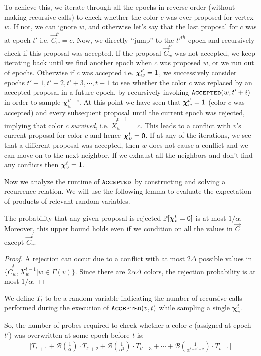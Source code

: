 To achieve this, we iterate through all the epochs in reverse order (without making recursive calls)
to check whether the color $c$ was ever proposed for vertex $w$.
If not, we can ignore $w$, and otherwise let's say that the last proposal for $c$ was at epoch $t'$ i.e. $\vec C^{t'}_w = c$.
Now, we directly ``jump'' to the $t'^{th}$ epoch and recursively check if this proposal was accepted.
If the proposal $\vec C^{t'}_w$ was not accepted, we keep iterating back until we find another epoch when $c$ was proposed $w$, or we run out of epochs.
Otherwise if $c$ was accepted i.e. $\bm\chi^{t'}_w = \mathsf{1}$,
we successively consider epochs $t'+1, t'+2, t'+3, \cdots, t-1$ to see whether the color $c$ was replaced by an accepted proposal in a future epoch,
by recursively invoking $\texttt{\textsc{Accepted}}(w,t'+i)$ in order to sample $\bm\chi^{t'+i}_w$.
At this point we have seen that $\bm\chi^{t'}_w = \mathsf{1}$ (color $c$ was accepted) and every subsequent proposal until the current epoch was rejected,
implying that color $c$ \emph{survived}, i.e. $\vec X^{t-1}_w = c$.
This leads to a conflict with $v$'s current proposal for color $c$ and hence $\bm\chi^t_v = \mathsf{0}$.
If at any of the iterations, we see that a different proposal was accepted, then $w$ does not cause a conflict and we can move on to the next neighbor.
If we exhaust all the neighbors and don't find any conflicts then $\bm\chi^t_v = \mathsf{1}$.

Now we analyze the runtime of $\texttt{\textsc{Accepted}}$ by constructing and solving a recurrence relation.
We will use the following lemma to evaluate the expectation of products of relevant random variables.

\begin{lemma}
\label{lem:color_reject_probability}
The probability that any given proposal is rejected $\mathbb P[\bm\chi^t_v=\mathsf{0}]$ is at most $1/\alpha$.
Moreover, this upper bound holds even if we condition on all the values in $\vec C$ except $\vec C^t_v$.
\end{lemma}
\begin{proof}
A rejection can occur due to a conflict with at most $2\Delta$ possible values in $\{\vec C^t_w, X^{t-1}_w | w\in\Gamma(v)\}$.
Since there are $2\alpha\Delta$ colors, the rejection probability is at most $1/\alpha$.
\end{proof}

\begin{definition}
\label{def:coloring_recursions}
We define $T_t$ to be a random variable indicating the number of recursive calls performed during the execution of $\texttt{\textsc{Accepted}}(v,t)$
while sampling a single $\bm \chi_v^t$.
\end{definition}
So, the number of probes required to check whether a color $c$ (assigned at epoch $t'$) was overwritten at some epoch before $t$ is:
\begin{align}
\label{eq:color_overwrite}
\Biggl[T_{t'+1} + \mathcal B\left(\frac{1}{\alpha}\right)\cdot T_{t'+2}
+ \mathcal B\left(\frac{1}{\alpha^2}\right)\cdot T_{t'+3} + \cdots
+ \mathcal B\left(\frac{1}{\alpha^{t-t'-2}}\right)\cdot T_{t-1} \Biggr]
\end{align}

